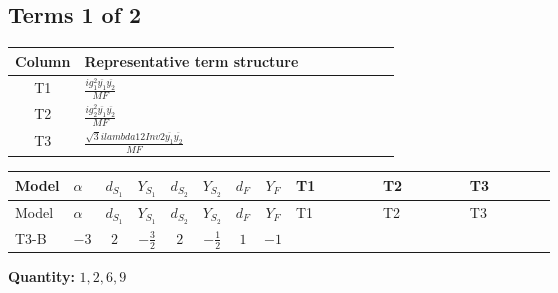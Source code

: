 \documentclass[8pt]{article}
\begin{document}
\begin{landscape}
\subsection*{Terms 1 of 2}
\begin{center}
\begin{tabular}{@{}c >{\raggedright\arraybackslash}p{0.82\linewidth}@{}}
\toprule
Column & Representative term structure \\
\midrule
T1 & \(\displaystyle \frac{i g_{1}^{2} \overline{y_{1}} \overline{y_{2}}}{MF}\) \\
\midrule
T2 & \(\displaystyle \frac{i g_{2}^{2} \overline{y_{1}} \overline{y_{2}}}{MF}\) \\
\midrule
T3 & \(\displaystyle \frac{\sqrt{3} i lambda12Inv2 \overline{y_{1}} \overline{y_{2}}}{MF}\) \\
\midrule
\bottomrule
\end{tabular}
\end{center}
\smallskip
\tiny
\begin{longtable}{@{}llcccccc >{\raggedright\arraybackslash}p{0.21\linewidth} >{\raggedright\arraybackslash}p{0.21\linewidth} >{\raggedright\arraybackslash}p{0.21\linewidth}@{}}
\toprule
Model & $\alpha$ & $d_{S_1}$ & $Y_{S_1}$ & $d_{S_2}$ & $Y_{S_2}$ & $d_F$ & $Y_F$ & T1 & T2 & T3 \\
\midrule
\endfirsthead
\toprule
Model & $\alpha$ & $d_{S_1}$ & $Y_{S_1}$ & $d_{S_2}$ & $Y_{S_2}$ & $d_F$ & $Y_F$ & T1 & T2 & T3 \\
\midrule
\endhead
T3-B & $-3$ & $2$ & $-\frac{3}{2}$ & $2$ & $-\frac{1}{2}$ & $1$ & $-1$ & \scriptsize\adjustbox{max width=\linewidth}{$\begin{gathered} - \frac{3 i g_{1}^{2} \overline{y_{1}} \overline{y_{2}}}{4 MF}\end{gathered}$} & \scriptsize\adjustbox{max width=\linewidth}{$\begin{gathered} - \frac{3 i g_{2}^{2} \overline{y_{1}} \overline{y_{2}}}{8 MF}\end{gathered}$} & \scriptsize\adjustbox{max width=\linewidth}{$\begin{gathered} - \frac{\sqrt{3} i lambda12Inv2 \overline{y_{1}} \overline{y_{2}}}{6 MF}\end{gathered}$} \\
\midrule
\bottomrule
\end{longtable}
\clearpage
\noindent\textbf{Quantity: }$\mathrm{1,2,6,9}$\par\smallskip

\end{landscape}
\end{document}
